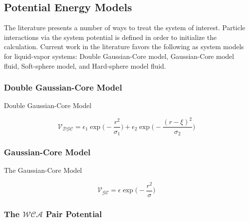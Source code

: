 \documentclass[letterpaper,twocolumn,amsmath,amssymb,pre,aps,10pt]{revtex4-1}
\begin{document}
\subsection{Potential Energy Models}

The literature presents a number of ways to treat the system of 
interest.  Particle interactions via the system potential is defined in 
order to initialize the calculation.  Current work in the literature 
favors the following as system models for liquid-vapor systems: Double 
Gaussian-Core model, Gaussian-Core model fluid, Soft-sphere model, and 
Hard-sphere model fluid.

\subsubsection{Double Gaussian-Core Model}

Double Gaussian-Core Model

\begin{equation}
\mathcal{V}_{\mathcal{DGC}}=\epsilon_1\exp\bigg(-\frac{r^2}{\sigma_1}\bigg)+\epsilon_2\exp\bigg(-\frac{(r-\xi)^2}{\sigma_2}\bigg)
\end{equation}

\subsubsection{Gaussian-Core Model}

The Gaussian-Core Model

\begin{equation}
	\mathcal{V}_{\mathcal{GC}}=\epsilon\exp\bigg(-\frac{r^2}{\sigma}\bigg)
\end{equation}
  
\subsubsection{The $\mathcal{WCA}$ Pair Potential}
\end{document}
